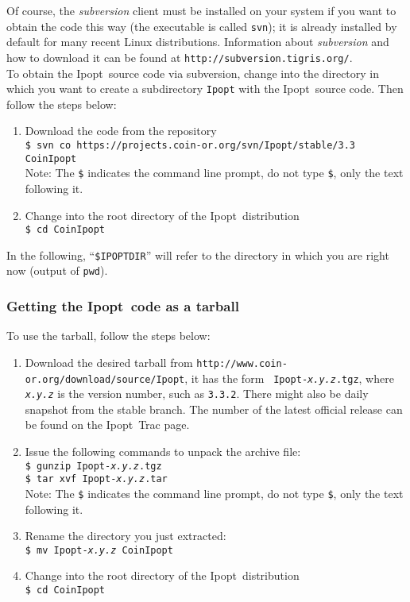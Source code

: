 \documentclass[10pt]{article}
\newcommand{\Ipopt}{{\sc Ipopt}}
\begin{document}
Of course, the \textit{subversion} client must be installed on your
system if you want to obtain the code this way (the executable is
called \texttt{svn}); it is already installed by default for many
recent Linux distributions.  Information about \textit{subversion} and
how to download it can be found at
\texttt{http://subversion.tigris.org/}.\\

To obtain the \Ipopt\ source code via subversion, change into the
directory in which you want to create a subdirectory {\tt Ipopt} with
the \Ipopt\ source code.  Then follow the steps below:
\begin{enumerate}
\item{Download the code from the repository}\\
{\tt \$ svn co https://projects.coin-or.org/svn/Ipopt/stable/3.3 CoinIpopt} \\
Note: The {\tt \$} indicates the command line
prompt, do not type {\tt \$}, only the text following it.
\item Change into the root directory of the \Ipopt\ distribution\\
{\tt \$ cd CoinIpopt}
\end{enumerate}

In the following, ``\texttt{\$IPOPTDIR}'' will refer to the directory in
which you are right now (output of \texttt{pwd}).

\subsubsection{Getting the \Ipopt\ code as a tarball}

To use the tarball, follow the steps below:
\begin{enumerate}
\item Download the desired tarball from
  \texttt{http://www.coin-or.org/download/source/Ipopt}, it has the form {\tt
    Ipopt-{\em x.y.z}.tgz}, where {\tt\em x.y.z} is the version
  number, such as {\tt 3.3.2}.  There might also be daily snapshot
  from the stable branch.  The number of the latest official release
  can be found on the \Ipopt\ Trac page.
\item Issue the following commands to unpack the archive file: \\
\texttt{\$ gunzip Ipopt-{\em x.y.z}.tgz} \\
\texttt{\$ tar xvf Ipopt-{\em x.y.z}.tar} \\
Note: The {\tt \$} indicates the command line
prompt, do not type {\tt \$}, only the text following it.
\item Rename the directory you just extracted:\\
\texttt{\$ mv Ipopt-{\em x.y.z} CoinIpopt}
\item Change into the root directory of the \Ipopt\ distribution\\
{\tt \$ cd CoinIpopt}
\end{enumerate}
\end{document}
